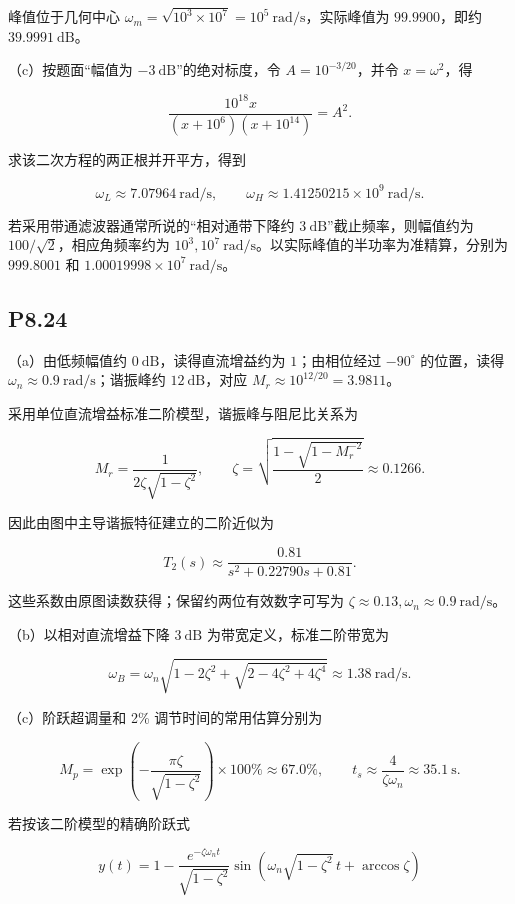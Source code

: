 \documentclass[UTF8,12pt]{ctexart}
\begin{document}
峰值位于几何中心 $\omega_m=\sqrt{10^3\times10^7}=10^5\ \mathrm{rad/s}$，实际峰值为 $99.9900$，即约 $39.9991\ \mathrm{dB}$。

（c）按题面“幅值为 $-3\ \mathrm{dB}$”的绝对标度，令 $A=10^{-3/20}$，并令 $x=\omega^2$，得

\[
\frac{10^{18}x}{(x+10^6)(x+10^{14})}=A^2.
\]

求该二次方程的两正根并开平方，得到

\[
\omega_L\approx7.07964\ \mathrm{rad/s},\qquad\omega_H\approx1.41250215\times10^9\ \mathrm{rad/s}.
\]

若采用带通滤波器通常所说的“相对通带下降约 $3\ \mathrm{dB}$”截止频率，则幅值约为 $100/\sqrt2$，相应角频率约为 $10^3,10^7\ \mathrm{rad/s}$。以实际峰值的半功率为准精算，分别为 $999.8001$ 和 $1.00019998\times10^7\ \mathrm{rad/s}$。


\subsection*{P8.24}
（a）由低频幅值约 $0\ \mathrm{dB}$，读得直流增益约为 $1$；由相位经过 $-90^\circ$ 的位置，读得 $\omega_n\approx0.9\ \mathrm{rad/s}$；谐振峰约 $12\ \mathrm{dB}$，对应 $M_r\approx10^{12/20}=3.9811$。

采用单位直流增益标准二阶模型，谐振峰与阻尼比关系为

\[
M_r=\frac1{2\zeta\sqrt{1-\zeta^2}},\qquad\zeta=\sqrt{\frac{1-\sqrt{1-M_r^{-2}}}{2}}\approx0.1266.
\]

因此由图中主导谐振特征建立的二阶近似为

\[
\boxed{T_2(s)\approx\frac{0.81}{s^2+0.22790s+0.81}}.
\]

这些系数由原图读数获得；保留约两位有效数字可写为 $\zeta\approx0.13,\omega_n\approx0.9\ \mathrm{rad/s}$。

（b）以相对直流增益下降 $3\ \mathrm{dB}$ 为带宽定义，标准二阶带宽为

\[
\omega_B=\omega_n\sqrt{1-2\zeta^2+\sqrt{2-4\zeta^2+4\zeta^4}}\approx1.38\ \mathrm{rad/s}.
\]

（c）阶跃超调量和 2\% 调节时间的常用估算分别为

\[
M_p=\exp\left(-\frac{\pi\zeta}{\sqrt{1-\zeta^2}}\right)\times100\%\approx67.0\%,\qquad t_s\approx\frac4{\zeta\omega_n}\approx35.1\ \mathrm{s}.
\]

若按该二阶模型的精确阶跃式

\[
y(t)=1-\frac{e^{-\zeta\omega_n t}}{\sqrt{1-\zeta^2}}\sin\!\left(\omega_n\sqrt{1-\zeta^2}\,t+\arccos\zeta\right)
\]
\end{document}
